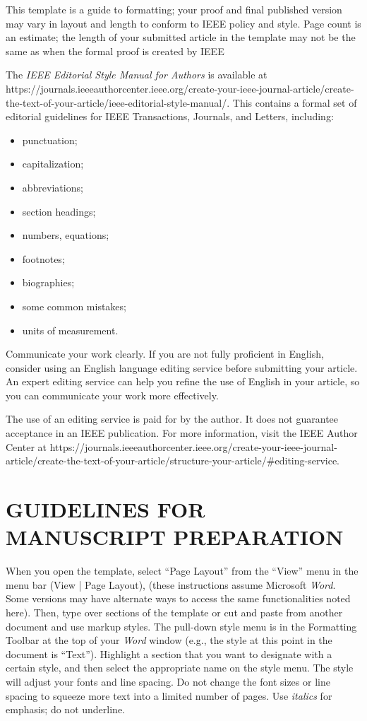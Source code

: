 \documentclass{IEEEtaes}
\begin{document}
This template is a guide to formatting; your proof and final published version may vary in layout and length to conform to IEEE policy and style. Page count is an estimate; the length of your submitted article in the template may not be the same as when the formal proof is created by IEEE

The {\it IEEE Editorial Style Manual for Authors} is available at {https://journals.ieeeauthorcenter.ieee.org/create-your-ieee-journal-article/create-the-text-of-your-article/ieee-editorial-style-manual/}. This contains a formal set of editorial guidelines for IEEE Transactions, Journals, and Letters, including:
\begin{itemize}
\item punctuation;
\item capitalization;
\item abbreviations;
\item section headings;
\item numbers, equations;
\item footnotes;
\item biographies;
\item some common mistakes;
\item units of measurement.
\end{itemize}

Communicate your work clearly. If you are not fully proficient in English, consider using an English language editing service before submitting your article. An expert editing service can help you refine the use of English in your article, so you can communicate your work more effectively.

The use of an editing service is paid for by the author. It does not guarantee acceptance in an IEEE publication. For more information, visit the IEEE Author Center at {https://journals.ieeeauthorcenter.ieee.org/create-your-ieee-journal-article/create-the-text-of-your-article/structure-your-article/\#editing-service}.

\section{GUIDELINES FOR MANUSCRIPT PREPARATION}

When you open the template, select ``Page Layout'' from the ``View'' menu in the menu bar (View | Page Layout), (these instructions assume Microsoft {\it Word}. Some versions may have alternate ways to access the same functionalities noted here). Then, type over sections of the template or cut and paste from another document and use markup styles. The pull-down style menu is in the Formatting Toolbar at the top of your {\it Word} window (e.g., the style at this point in the document is ``Text''). Highlight a section that you want to designate with a certain style, and then select the appropriate name on the style menu. The style will adjust your fonts and line spacing. Do not change the font sizes or line spacing to squeeze more text into a limited number of pages. Use {\it italics} for emphasis; do not underline.
\end{document}
